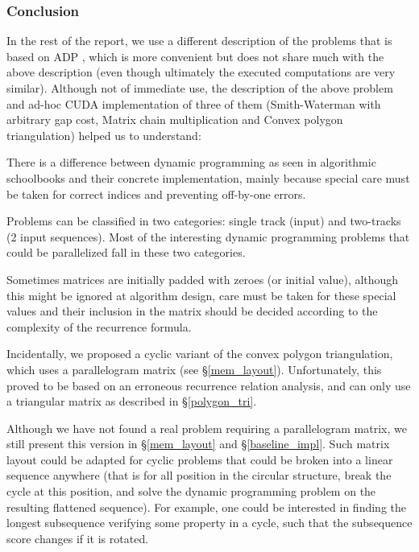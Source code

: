 \subsubsection{Conclusion} \label{problems_end}
In the rest of the report, we use a different description of the problems that is based on ADP \cite{adp}, which is more convenient but does not share much with the above description (even though ultimately the executed computations are very similar). Although not of immediate use, the description of the above problem and ad-hoc CUDA implementation of three of them (Smith-Waterman with arbitrary gap cost, Matrix chain multiplication and Convex polygon triangulation) helped us to understand:\ol
\item There is a difference between dynamic programming as seen in algorithmic schoolbooks and their concrete implementation, mainly because special care must be taken for correct indices and preventing off-by-one errors.
\item Problems can be classified in two categories: single track (input) and two-tracks (2 input sequences). Most of the interesting dynamic programming problems that could be parallelized fall in these two categories.
\item Sometimes matrices are initially padded with zeroes (or initial value), although this might be ignored at algorithm design, care must be taken for these special values and their inclusion in the matrix should be decided according to the complexity of the recurrence formula.
\item Incidentally, we proposed a cyclic variant of the convex polygon triangulation, which uses a parallelogram matrix (see \S\ref{mem_layout}). Unfortunately, this proved to be based on an erroneous recurrence relation analysis, and can only use a triangular matrix as described in \S\ref{polygon_tri}.

Although we have not found a real problem requiring a parallelogram matrix, we still present this version in \S\ref{mem_layout} and \S\ref{baseline_impl}. Such matrix layout could be adapted for cyclic problems that could be broken into a linear sequence anywhere (that is for all position in the circular structure, break the cycle at this position, and solve the dynamic programming problem on the resulting flattened sequence). For example, one could be interested in finding the longest subsequence verifying some property in a cycle, such that the subsequence score changes if it is rotated.
\ole

